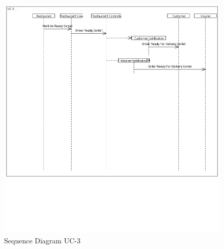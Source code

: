 \begin{figure}[h!]
\begin{center}
\includegraphics[scale=0.35]{FIGS/UC-31.PNG}
    \caption{Sequence Diagram UC-3}
    \label{fig:seq_diag3}
\end{center}
\end{figure}

